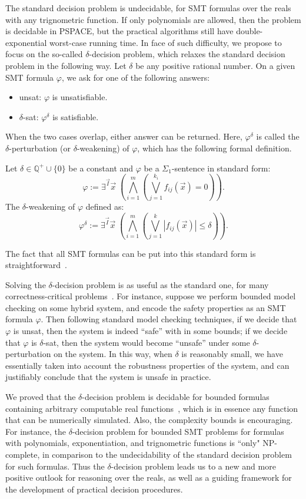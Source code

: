 \documentclass[envcountsect]{llncs}
\begin{document}
The standard decision problem is undecidable, for SMT formulas
over the reals with any trignometric function. If only polynomials are allowed,
then the problem is decidable in {\sf PSPACE}, but the practical algorithms
still have
double-exponential worst-case running time. In face of such difficulty, we
propose to focus on the so-called $\delta$-decision problem, which relaxes the
standard decision problem in the following way. Let $\delta$ be any positive
rational number. On a given SMT formula $\varphi$, we ask for one of the
following answers:
\begin{itemize}
 \item {\sf unsat}: $\varphi$ is unsatisfiable.
 \item {\sf $\delta$-sat}: $\varphi^{\delta}$ is satisfiable.
\end{itemize}
When the two cases overlap, either answer can be returned. Here,
$\varphi^{\delta}$ is called the $\delta$-perturbation (or $\delta$-weakening)
of $\varphi$, which has the following formal definition.
\begin{definition}
 Let $\delta\in \mathbb{Q}^+\cup\{0\}$ be a constant and $\varphi$ be a
$\Sigma_1$-sentence in standard form:
\[\varphi:= \exists^{\vec I}\vec x\;(\bigwedge_{i=1}^m (\bigvee_{j=1}^{k_i}
f_{ij}(\vec x)= 0)).
\]
The $\delta$-weakening of $\varphi$ defined as:
\[\varphi^{\delta}:= \exists^{\vec I} \vec x\;(\bigwedge_{i=1}^m(\bigvee_{j=1}^k
|f_{ij}(\vec x)|\leq \delta)).\]
\end{definition}
The fact that all SMT formulas can be put into this standard form is
straightforward~\cite{}.

Solving the $\delta$-decision problem is as useful as the standard one, for many
correctness-critical problems~\cite{}. For instance, suppose we perform bounded
model checking on some hybrid system, and encode the safety properties as an SMT
formula $\varphi$. Then following standard model checking techniques, if we
decide that $\varphi$ is {\sf unsat}, then the system is indeed ``safe'' with in
some bounds; if we decide that $\varphi$ is {\sf $\delta$-sat}, then the system
would become ``unsafe'' under some $\delta$-perturbation on the system. In this
way, when $\delta$ is reasonably small, we have essentially taken into account
the robustness properties of the system, and can justifiably conclude that the
system is unsafe in practice.

We
proved that the $\delta$-decision problem is decidable for bounded formulas
containing arbitrary computable real functions~\cite{}, which is in essence any
function that can be numerically simulated. Also, the complexity bounds is
encouraging. For instance, the $\delta$-decision problem for bounded SMT
problems for formulas with polynomials,
exponentiation, and trignometric functions is ``only" {\sf NP}-complete, in
comparison to the undecidability of the standard decision problem for such
formulas.  Thus the $\delta$-decision problem leads us to a new and more
positive outlook for reasoning over the reals, as well
as a guiding framework for the development of practical decision procedures.
\end{document}
